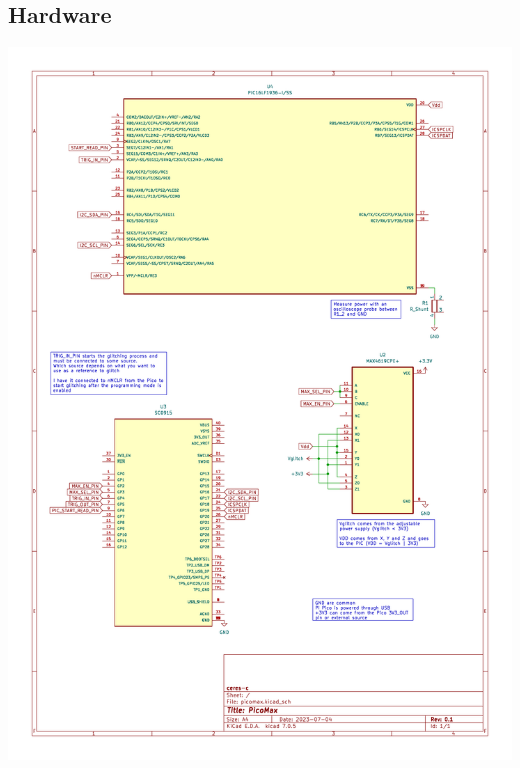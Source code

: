 \documentclass[a4paper,english,twoside,10pt]{article}
\begin{document}
\clearpage%
\printglossary[type=\acronymtype]%
\printglossary%
{
\raggedright%


}

\clearpage%
\begin{appendix}
\section{Hardware}\label{app:hardware}
\begin{center}
	\includegraphics[height=.95\textheight]{../hardware/schematic.pdf}
\end{center}
\end{appendix}
\end{document}
